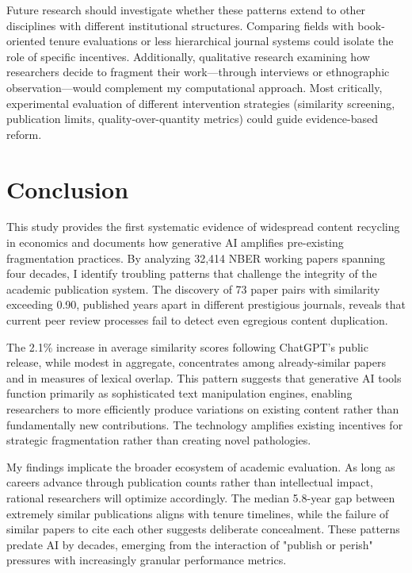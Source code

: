 \documentclass[12pt]{article}
\begin{document}
Future research should investigate whether these patterns extend to other disciplines with different institutional structures. Comparing fields with book-oriented tenure evaluations or less hierarchical journal systems could isolate the role of specific incentives. Additionally, qualitative research examining how researchers decide to fragment their work—through interviews or ethnographic observation—would complement my computational approach. Most critically, experimental evaluation of different intervention strategies (similarity screening, publication limits, quality-over-quantity metrics) could guide evidence-based reform.

\section{Conclusion}
\label{sec:conclusion}

This study provides the first systematic evidence of widespread content recycling in economics and documents how generative AI amplifies pre-existing fragmentation practices. By analyzing 32,414 NBER working papers spanning four decades, I identify troubling patterns that challenge the integrity of the academic publication system. The discovery of 73 paper pairs with similarity exceeding 0.90, published years apart in different prestigious journals, reveals that current peer review processes fail to detect even egregious content duplication.

The 2.1\% increase in average similarity scores following ChatGPT's public release, while modest in aggregate, concentrates among already-similar papers and in measures of lexical overlap. This pattern suggests that generative AI tools function primarily as sophisticated text manipulation engines, enabling researchers to more efficiently produce variations on existing content rather than fundamentally new contributions. The technology amplifies existing incentives for strategic fragmentation rather than creating novel pathologies.

My findings implicate the broader ecosystem of academic evaluation. As long as careers advance through publication counts rather than intellectual impact, rational researchers will optimize accordingly. The median 5.8-year gap between extremely similar publications aligns with tenure timelines, while the failure of similar papers to cite each other suggests deliberate concealment. These patterns predate AI by decades, emerging from the interaction of "publish or perish" pressures with increasingly granular performance metrics.
\end{document}
